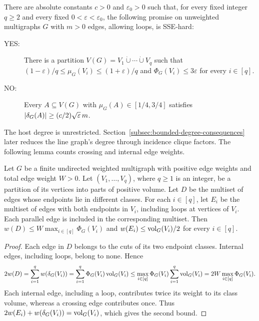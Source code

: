 \begin{lemma}\label{lem:sse-unweighted-gap}
There are absolute constants $c>0$ and $\varepsilon_0>0$ such that,
for every fixed integer $q\geq2$ and every fixed
$0<\varepsilon<\varepsilon_0$, the following promise on unweighted
multigraphs $G$ with $m>0$ edges, allowing loops, is SSE-hard:
\begin{description}
\item[YES:] There is a partition
  $V(G)=V_1\mathbin{\dot\cup}\cdots\mathbin{\dot\cup}V_q$ such that
  $(1-\varepsilon)/q\leq\mu_G(V_i)\leq(1+\varepsilon)/q$ and
  $\Phi_G(V_i)\leq3\varepsilon$ for every $i\in[q]$.
\item[NO:] Every $A\subseteq V(G)$ with
  $\mu_G(A)\in[1/4,3/4]$ satisfies
  $|\delta_G(A)|\geq(c/2)\sqrt{\varepsilon}\,m$.
\end{description}
\end{lemma}

The host degree is unrestricted. Section~\ref{subsec:bounded-degree-consequences}
later reduces the line graph's degree through incidence clique
factors. The following lemma counts crossing and internal edge weights.

\begin{lemma}
\label{lem:sse-yes-edge-counts}
Let $G$ be a finite undirected weighted multigraph with positive
edge weights and total edge weight $W>0$.
Let $(V_1,\ldots,V_q)$, where $q\geq1$ is an integer, be a partition
of its vertices into parts of positive volume.
Let $D$ be the multiset of edges whose endpoints lie in different
classes. For each $i\in[q]$, let $E_i$ be the multiset of edges with both
endpoints in $V_i$, including loops at vertices of $V_i$. Each
parallel edge is included in the corresponding multiset. Then
$w(D)\leq W\max_{i\in[q]}\Phi_G(V_i)$ and
$w(E_i)\leq\operatorname{vol}_G(V_i)/2$ for every $i\in[q]$.
\end{lemma}

\begin{proof}
Each edge in $D$ belongs to the cuts of its two endpoint classes.
Internal edges, including loops, belong to none. Hence
\[
  2w(D)=\sum_{i=1}^q w(\delta_G(V_i))
  =\sum_{i=1}^q\Phi_G(V_i)\operatorname{vol}_G(V_i)
  \leq\max_{i\in[q]}\Phi_G(V_i)\sum_{i=1}^q\operatorname{vol}_G(V_i)
  =2W\max_{i\in[q]}\Phi_G(V_i).
\]
Each internal edge, including a loop, contributes twice its weight
to its class volume, whereas a crossing edge contributes once. Thus
$2w(E_i)+w(\delta_G(V_i))=\operatorname{vol}_G(V_i)$, which gives the second bound.
\end{proof}

